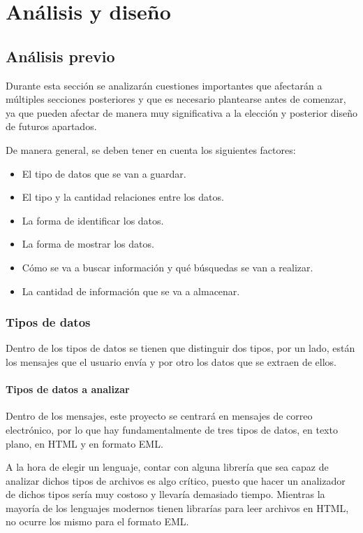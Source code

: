 \chapter{Análisis y diseño}
\section{Análisis previo}
Durante esta sección se analizarán cuestiones importantes que afectarán a múltiples secciones posteriores y que es necesario plantearse antes de comenzar, ya que pueden afectar de manera muy significativa a la elección y posterior diseño de futuros apartados.

De manera general, se deben tener en cuenta los siguientes factores:
\begin{itemize}
    \item El tipo de datos que se van a guardar.
    \item El tipo y la cantidad relaciones entre los datos.
    \item La forma de identificar los datos. 
    \item La forma de mostrar los datos. 
    \item Cómo se va a buscar información y qué búsquedas se van a realizar.
    \item La cantidad de información que se va a almacenar. 
\end{itemize}

\subsection{Tipos de datos}
Dentro de los tipos de datos se tienen que distinguir dos tipos, por un lado, están los mensajes que el usuario envía y por otro los datos que se extraen de ellos. 
\subsubsection{Tipos de datos a analizar}
Dentro de los mensajes, este proyecto se centrará en mensajes de correo electrónico, por lo que hay fundamentalmente de tres tipos de datos, en texto plano, en HTML \cite{html_wiki} y en formato EML.

A la hora de elegir un lenguaje, contar con alguna librería que sea capaz de analizar dichos tipos de archivos es algo crítico, puesto que hacer un analizador de dichos tipos sería muy costoso y llevaría demasiado tiempo. Mientras la mayoría de los lenguajes modernos tienen librarías para leer archivos en HTML, no ocurre los mismo para el formato EML. 

